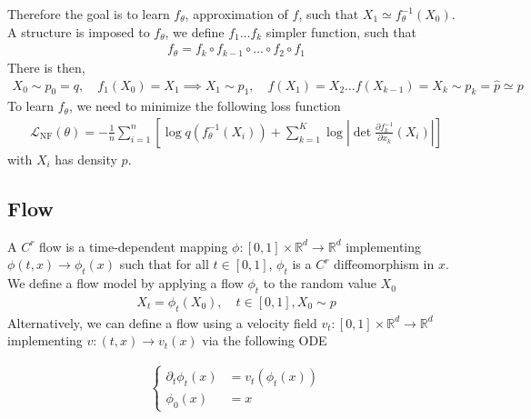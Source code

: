 \documentclass{article}
\begin{document}
Therefore the goal is to learn \(f_\theta\), approximation of \(f\), such that \(X_1 \simeq f_\theta^{-1}(X_0)\). \\
A structure is imposed to $f_\theta$, we define $f_1\ldots f_k$ simpler function,  such that
\begin{align}
    f_\theta = f_k\circ f_{k-1}\circ\ldots\circ f_2\circ f_1
\end{align}
There is then, 
\begin{align}
    X_0\sim p_0=q, \quad f_1(X_0) = X_1 \implies X_1\sim p_1,\quad f(X_1)=X_2 \ldots f(X_{k-1})=X_k \sim p_k = \hat{p} \simeq p
\end{align}
To learn \(f_\theta\), we need to minimize the following loss function
\begin{align}
    \mathcal{L}_\text{NF}(\theta) = -\frac{1}{n}\sum_{i=1}^n \left[ \log q(f_\theta^{-1}(X_i)) + \sum_{k=1}^K \log \left| \det\frac{\partial f_k^{-1}}{\partial x_k}(X_i) \right| \right] 
\end{align}
with \(X_i\) has density \(p\). \\


\subsection{Flow}
A $C^r$ flow is a time-dependent mapping $\phi : [0,1]\times \mathbb{R}^d\rightarrow\mathbb{R}^d$ implementing $\phi(t,x) \rightarrow \phi_t(x)$ such that for all $t\in[0,1]$, $\phi_t$ is a $C^r$ diffeomorphism in $x$.
We define a flow model by applying a flow $\phi_t$ to the random value $X_0$
\begin{align}\label{flow-model}
    X_t=\phi_t(X_0), \quad t \in[0,1], X_0\sim p 
\end{align}
Alternatively, we can define a flow using a velocity field \(v_t:[0,1]\times\mathbb{R}^d\rightarrow \mathbb{R}^d\) implementing \(v:(t,x)\rightarrow v_t(x)\) via the following ODE 

\begin{align}\label{ODE}
\left\{
    \begin{array}{ll}
        \partial_t \phi_t(x)&=v_t(\phi_t(x))\\
        \phi_0(x)&=x 
    \end{array}
\right.
\end{align}
\end{document}
